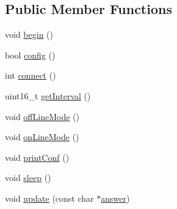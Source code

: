 \subsection*{Public Member Functions}
\begin{DoxyCompactItemize}
\item 
void \hyperlink{classCoolBoard_acba7c5aef7268b2c0044bdb54d3b9d76}{begin} ()
\item 
bool \hyperlink{classCoolBoard_a583a874c09c07e70a6eb9229fc4beddb}{config} ()
\item 
int \hyperlink{classCoolBoard_a519de78b807f8ec6463ff484eb925918}{connect} ()
\item 
uint16\+\_\+t \hyperlink{classCoolBoard_a31cf73a70425114cd7ee49c6e5244199}{get\+Interval} ()
\item 
void \hyperlink{classCoolBoard_ae6b5e1274d760462290192acea4adca8}{off\+Line\+Mode} ()
\item 
void \hyperlink{classCoolBoard_aa0bbc4bc605e35618d18e68795c61363}{on\+Line\+Mode} ()
\item 
void \hyperlink{classCoolBoard_a486507b8f0981d3cc671ed31c2145755}{print\+Conf} ()
\item 
void \hyperlink{classCoolBoard_a5caa34e713c0b138e34390ddc4208fd3}{sleep} ()
\item 
void \hyperlink{classCoolBoard_a8612756d3f73198cdde857a66f0fe690}{update} (const char $\ast$\hyperlink{classCoolBoard_a7b835fafd449e5282f7f91d787a2dc15}{answer})
\end{DoxyCompactItemize}
